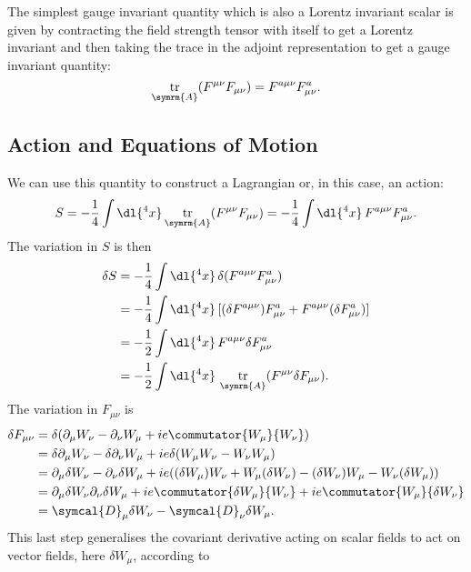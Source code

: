 \documentclass[fleqn]{NotesClass}
\DeclareMathOperator{\tr}{tr}
\newcommand{\covariantDerivative}{\symcal{D}}
\begin{document}
    The simplest gauge invariant quantity which is also a Lorentz invariant scalar is given by contracting the field strength tensor with itself to get a Lorentz invariant and then taking the trace in the adjoint representation to get a gauge invariant quantity:
    \begin{equation}
        \tr_{\symrm{A}}(F^{\mu\nu}F_{\mu\nu}) = F^{a\mu\nu}F^a_{\mu\nu}.
    \end{equation}
    
    \subsection{Action and Equations of Motion}
    We can use this quantity to construct a Lagrangian or, in this case, an action:
    \begin{equation}
        S = -\frac{1}{4} \int \dl{^4x} \tr_{\symrm{A}}(F^{\mu\nu}F_{\mu\nu}) = -\frac{1}{4} \int \dl{^4x} \, F^{a\mu\nu}F^a_{\mu\nu}.
    \end{equation}
    The variation in \(S\) is then
    \begin{align}
        \delta S &= -\frac{1}{4} \int \dl{^4x} \, \delta(F^{a\mu\nu}F^a_{\mu\nu})\\
        &= -\frac{1}{4} \int \dl{^4x} \, [(\delta F^{a\mu\nu})F^a_{\mu\nu} + F^{a\mu\nu}(\delta F^a_{\mu\nu})]\\
        &= -\frac{1}{2} \int \dl{^4x} \, F^{a\mu\nu}\delta F^a_{\mu\nu}\\
        &= -\frac{1}{2} \int \dl{^4x} \, \tr_{\symrm{A}}(F^{\mu\nu} \delta F_{\mu\nu}).
    \end{align}
    The variation in \(F_{\mu\nu}\) is
    \begin{align}
        \delta F_{\mu\nu} &= \delta(\partial_\mu W_\nu - \partial_\nu W_\mu + ie\commutator{W_\mu}{W_\nu})\\
        &= \delta\partial_\mu W_\nu - \delta\partial_\nu W_\mu + ie\delta(W_\mu W_\nu - W_\nu W_\mu)\\
        &= \partial_\mu\delta W_\nu - \partial_\nu\delta W_\mu + ie((\delta W_\mu) W_\nu + W_\mu (\delta W_\nu) - (\delta W_\nu) W_\mu - W_\nu (\delta W_\mu)) \notag\\
        &= \partial_\mu \delta W_\nu \partial_\nu \delta W_\mu + ie \commutator{\delta W_\mu}{W_\nu} + ie \commutator{W_\mu}{\delta W_\nu}\\
        &= \covariantDerivative_\mu \delta W_\nu - \covariantDerivative_\nu \delta W_\mu.
    \end{align}
    This last step generalises the covariant derivative acting on scalar fields to act on vector fields, here \(\delta W_\mu\), according to
\end{document}
